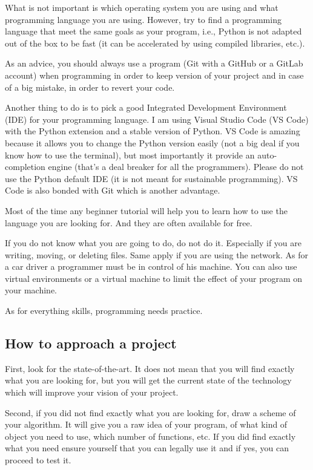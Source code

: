 \documentclass[english, 12 pt, openany, oneside]{book}
\begin{document}
What is not important is which operating system you are using and what programming language you are using. However, try to find a programming language that meet the same goals as your program, i.e., Python is not adapted out of the box to be fast (it can be accelerated by using compiled libraries, etc.).

As an advice, you should always use a  program (Git with a GitHub or a GitLab account) when programming in order to keep version of your project and in case of a big mistake, in order to revert your code.

Another thing to do is to pick a good Integrated Development Environment (IDE) for your programming language. I am using Visual Studio Code (VS Code) with the Python extension and a stable version of Python. VS Code is amazing because it allows you to change the Python version easily (not a big deal if you know how to use the terminal), but most importantly it provide an auto-completion engine (that's a deal breaker for all the programmers). Please do not use the Python default IDE (it is not meant for sustainable programming). VS Code is also bonded with Git which is another advantage.

Most of the time any beginner tutorial will help you to learn how to use the language you are looking for. And they are often available for free.

If you do not know what you are going to do, do not do it. Especially if you are writing, moving, or deleting files. Same apply if you are using the network. As for a car driver a programmer must be in control of his machine. You can also use virtual environments or a virtual machine to limit the effect of your program on your machine.

As for everything skills, programming needs practice.

\subsection{How to approach a project}
First, look for the state-of-the-art. It does not mean that you will find exactly what you are looking for, but you will get the current state of the technology which will improve your vision of your project.

Second, if you did not find exactly what you are looking for, draw a scheme of your algorithm. It will give you a raw idea of your program, of what kind of object you need to use, which number of functions, etc. If you did find exactly what you need ensure yourself that you can legally use it and if yes, you can proceed to test it.
\end{document}
